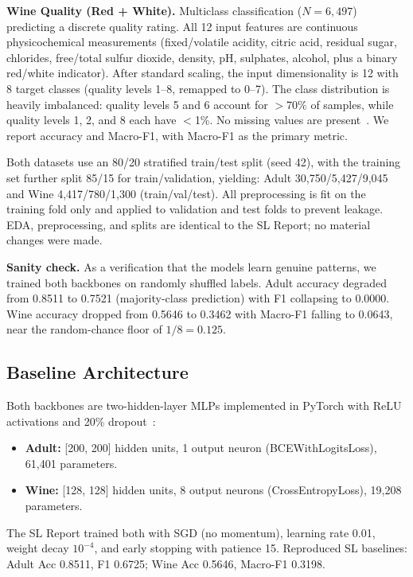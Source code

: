 \documentclass[10 pt, twocolumn]{article}
\begin{document}
\textbf{Wine Quality (Red + White).} Multiclass classification ($N = 6{,}497$) predicting a discrete quality rating. All 12 input features are continuous physicochemical measurements (fixed/volatile acidity, citric acid, residual sugar, chlorides, free/total sulfur dioxide, density, pH, sulphates, alcohol, plus a binary red/white indicator). After standard scaling, the input dimensionality is 12 with 8 target classes (quality levels 1--8, remapped to 0--7). The class distribution is heavily imbalanced: quality levels 5 and 6 account for $>$70\% of samples, while quality levels 1, 2, and 8 each have $<$1\%. No missing values are present~\cite{wine_dataset}. We report accuracy and Macro-F1, with Macro-F1 as the primary metric.

Both datasets use an 80/20 stratified train/test split (seed 42), with the training set further split 85/15 for train/validation, yielding: Adult 30{,}750/5{,}427/9{,}045 and Wine 4{,}417/780/1{,}300 (train/val/test). All preprocessing is fit on the training fold only and applied to validation and test folds to prevent leakage. EDA, preprocessing, and splits are identical to the SL Report; no material changes were made.

\textbf{Sanity check.} As a verification that the models learn genuine patterns, we trained both backbones on randomly shuffled labels. Adult accuracy degraded from 0.8511 to 0.7521 (majority-class prediction) with F1 collapsing to 0.0000. Wine accuracy dropped from 0.5646 to 0.3462 with Macro-F1 falling to 0.0643, near the random-chance floor of $1/8 = 0.125$.

\subsection{Baseline Architecture}

Both backbones are two-hidden-layer MLPs implemented in PyTorch with ReLU activations and 20\% dropout~\cite{srivastava2014dropout}:
\begin{itemize}
    \item \textbf{Adult:} [200, 200] hidden units, 1 output neuron (BCEWithLogitsLoss), 61{,}401 parameters.
    \item \textbf{Wine:} [128, 128] hidden units, 8 output neurons (CrossEntropyLoss), 19{,}208 parameters.
\end{itemize}
The SL Report trained both with SGD (no momentum), learning rate 0.01, weight decay $10^{-4}$, and early stopping with patience 15. Reproduced SL baselines: Adult Acc 0.8511, F1 0.6725; Wine Acc 0.5646, Macro-F1 0.3198. 
\end{document}
